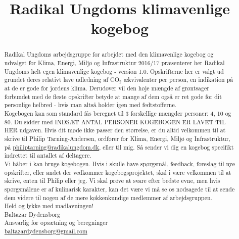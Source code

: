 \documentclass[11pt, a4paper]{article}
\newcommand{\coo}{CO$_2$ }
\begin{document}






\title{Radikal Ungdoms klimavenlige kogebog}
\author{}
\maketitle

\begin{abstract}
\noindent 	Radikal Ungdoms arbejdsgruppe for arbejdet med den klimavenlige kogebog og udvalget for Klima, Energi, Miljø og Infrastruktur 2016/17 præsenterer her Radikal Ungdoms helt egen klimavenlige kogebog - version 1.0. Opskrifterne her er valgt ud grundet deres relativt lave udledning af \coo ækvivalenter per person, en indikation på at de er gode for jordens klima. Derudover vil den høje mængde af grøntsager forbundet med de fleste opskrifter betyde at mange af dem også er ret gode for dit personlige helbred - hvis man altså holder igen med fedtstofferne.\\
	
\noindent	Kogebogen kan som standard fås beregnet til 3 forskellige mængder personer: 4, 10 og 80. Du sidder med INDSÆT ANTAL PERSONER KOGEBOGEN ER LAVET TIL HER udgaven. Hvis dit møde ikke passer den størrelse, er du altid velkommen til at skrive til Philip Tarning-Andersen, ordfører for Klima, Energi, Miljø og Infrastruktur, på \href{mailto:philiptarning@radikalungdom.dk}{philiptarning@radikalungdom.dk}, eller til mig. Så sender vi dig en kogebog specifikt indrettet til antallet af deltagere.\\
	
\noindent	Vi håber i kan bruge kogebogen. Hvis i skulle have spørgsmål, feedback, foreslag til nye opskrifter, eller andet der vedkommer kogebogsprojektet, skal i være velkommen til at skrive, enten til Philip eller jeg. Vi skal prøve at svare efter bedste evne, men hvis spørgsmålene er af kulinarisk karakter, kan det være vi må se os nødsagede til at sende dem videre til nogen af de mere køkkenkundige medlemmer af arbejdsgruppen.\\
	
\noindent	Held og lykke med madlavningen!\\
	Baltazar Dydensborg\\
	Ansvarlig for opsætning og beregninger\\
	\href{mailto:baltazardydensborg@gmail.com}{baltazardydensborg@gmail.com}
\end{abstract}
\newpage
\tableofcontents

\vspace{5em}
\newpage


	

	
\end{document}
